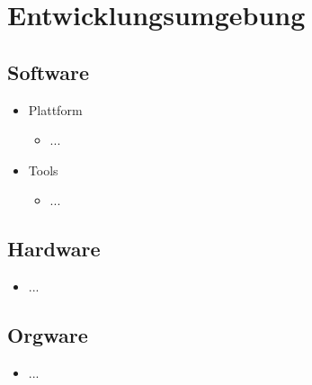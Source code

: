 
\section{Entwicklungsumgebung}


\subsection{Software}

\begin{itemize}
  \item Plattform
    \begin{itemize}
		\item ...
    \end{itemize}
  \item Tools
    \begin{itemize}
  		\item ...
    \end{itemize}

\end{itemize}

\subsection{Hardware}

\begin{itemize}
	\item ...
\end{itemize}

\subsection{Orgware}

\begin{itemize}
  	\item ...
\end{itemize}
